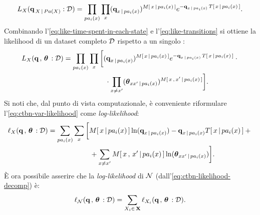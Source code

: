 \footnotesize
\begin{equation}\label{eq:like-time-spent-in-each-state}
L_{\setel{X}}(\param{q}_{\,\setel{X}\,\arrowvert\,Pa(\setel{X})}:\conceptsym{D})=\prod_{pa_i(\setel{x})}\prod_{x}(\param{q}_{x\,\arrowvert\,pa_i(\setel{x})})^{\mstat{x\,\arrowvert\,pa_i(\setel{x})}}e^{-\param{q}_{\setel{x}\,\arrowvert\,pa_i(\setel{x})}\,\tstat{\setel{x}\,\arrowvert\,pa_i(\setel{x})}}\text{\normalsize .}\vspace{1mm}
\end{equation}\normalsize
Combinando l'\autoref{eq:like-time-spent-in-each-state} e l'\autoref{eq:like-transitions} si ottiene la likelihood di un dataset completo $\mathcal{D}$ rispetto a un singolo \mprocess*{} \cond*{}:
\footnotesize
\begin{align}\label{eq:ctbn-var-likelihood}
L_{\setel{X}}(\param{q}\,,\,\param{$\theta$}\,:\conceptsym{D}) &= \prod_{pa_i(\setel{x})}\prod_{\setel{x}} \bigg[ (\param{q}_{\setel{x}\,\arrowvert\,pa_i(\setel{x})})^{\mstat{x\,\arrowvert\,pa_i(\setel{x})}}e^{-\param{q}_{\setel{x}\,\arrowvert\,pa_i(\setel{x})}\,\tstat{x\,\arrowvert\,pa_i(\setel{x})}} \cdot \bigg.\nonumber\\
& \qquad \bigg.{} \qquad \qquad \cdot \prod_{\setel{x}\neq \setel{x}^{\prime}}(\param{$\theta$}_{\setel{x}\setel{x}^{\prime}\,\arrowvert\,pa_i(\setel{x})})^{\mstat[x]{\setel{x}^{\prime}\,\arrowvert\,pa_i(\setel{x})}} \bigg] \text{\normalsize .}
\end{align}
\normalsize
Si noti che, dal punto di vista computazionale, è conveniente riformulare l'\autoref{eq:ctbn-var-likelihood} come \emph{log-likelihood}:
\footnotesize
\begin{align}\label{eq:ctbn-var-log-likelihood}
\ell_{\setel{X}}(\param{q}\,,\,\param{$\theta$}\,:\conceptsym{D}) &= \sum_{pa_i(\setel{x})}\sum_{\setel{x}} \bigg[ \mstat{x\,\arrowvert\,pa_i(\setel{x})}\ln(\param{q}_{x\,\arrowvert\,pa_i(\setel{x})})- \param{q}_{\setel{x}\,\arrowvert\,pa_i(\setel{x})}\tstat{\setel{x}\,\arrowvert\,pa_i(\setel{x})} + \bigg.\nonumber\\
& \qquad \bigg.{} \qquad \qquad + \sum_{\setel{x}\neq \setel{x}^{\prime}}\mstat[x]{\setel{x}^{\prime}\,\arrowvert\,pa_i(\setel{x})}\ln(\param{$\theta$}_{\setel{x}\setel{x}^{\prime}\,\arrowvert\,pa_i(\setel{x})}) \bigg] \text{\normalsize .}
\end{align}
\normalsize
\`E ora possibile asserire che la \emph{log-likelihood} di $\mathcal{N}$ (dall'\autoref{eq:ctbn-likelihood-decomp}) è:
\begin{equation}\label{eq:ctbn-log-likelihood}
\ell_{\mathcal{N}}(\boldsymbol{\textbf{\text{q}}}\,,\,\boldsymbol{\textbf{\text{$\theta$}}}\,:\mathcal{D})=\sum_{\mathnormal{X}_i \in \, \mathbf{X}} \ell_{\mathnormal{X}_i}(\boldsymbol{\textbf{\text{q}}}\,,\,\boldsymbol{\textbf{\text{$\theta$}}}\,:\mathcal{D}) \text{.}
\end{equation}

